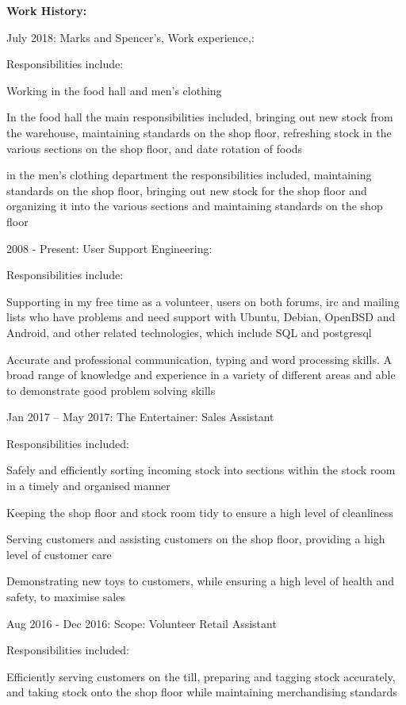 \documentclass[12pt,a4paper]{book}
\begin{document}
\begin{flushleft}
\textbf {Work History:}

July 2018: Marks and Spencer's, Work experience,:

Responsibilities include:

  Working in the food hall and men's clothing

  In the food hall the main responsibilities included, bringing out new
  stock from the warehouse, maintaining standards on the shop floor,
  refreshing stock in the various sections on the shop floor, and date
  rotation of foods

  in the men's clothing department the responsibilities included,
  maintaining standards on the shop floor, bringing out new stock for
  the shop floor and organizing it into the various sections and
  maintaining standards on the shop floor

  2008 - Present: User Support Engineering: 

Responsibilities include:

  Supporting in my free time as a volunteer, users on both forums, irc
  and mailing lists who have problems and need support with Ubuntu,
  Debian, OpenBSD and Android, and other related technologies, which
  include SQL and postgresql

  Accurate and professional communication, typing and word processing
  skills. A broad range of knowledge and experience in a variety of
  different areas and able to demonstrate good problem solving skills

Jan 2017 -- May 2017: The Entertainer: Sales Assistant
  
Responsibilities included:

  Safely and efficiently sorting incoming stock into sections within the
  stock room in a timely and organised manner

  Keeping the shop floor and stock room tidy to ensure a high level of
  cleanliness

  Serving customers and assisting customers on the shop floor, providing
  a high level of customer care

  Demonstrating new toys to customers, while ensuring a high level of
  health and safety, to maximise sales

  Aug 2016 - Dec 2016: Scope: Volunteer Retail Assistant

Responsibilities included:

  Efficiently serving customers on the till, preparing and tagging stock
  accurately, and taking stock onto the shop floor while maintaining
  merchandising standards


\end{flushleft}
\end{document}
